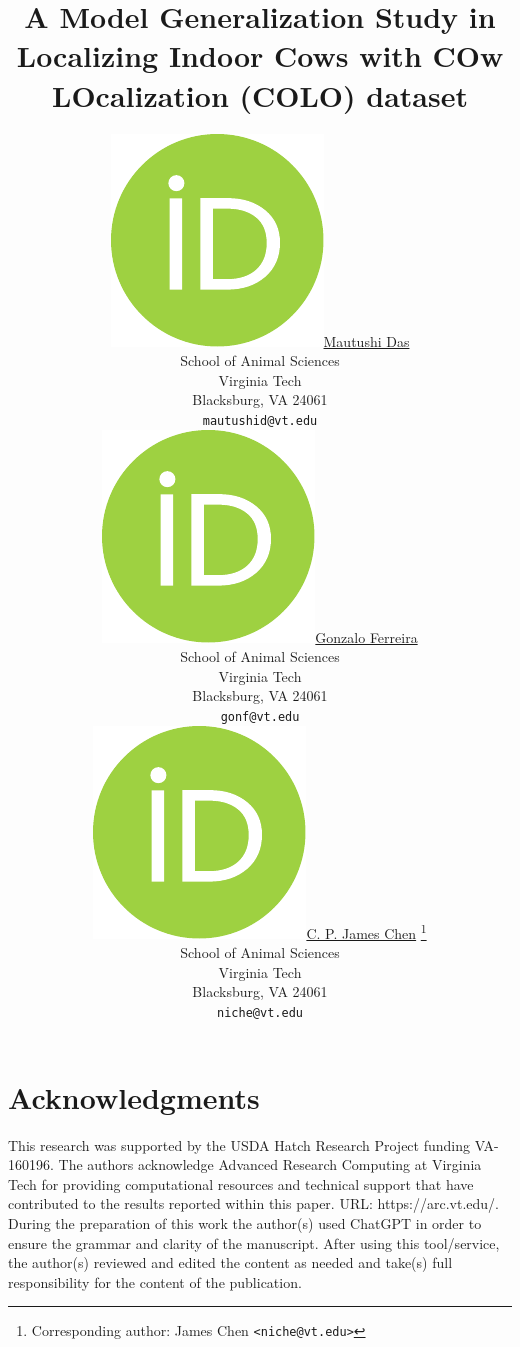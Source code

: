 \documentclass{article}
\title{A Model Generalization Study in Localizing Indoor Cows with COw LOcalization (COLO) dataset}
\author{
    \href{https://orcid.org/0009-0001-8932-142X}{\includegraphics[scale=0.06]{orcid.pdf}\hspace{1mm}Mautushi Das} \\
	School of Animal Sciences\\
	Virginia Tech\\
	Blacksburg, VA 24061 \\
	\texttt{mautushid@vt.edu} \\
	\And
    \href{https://orcid.org/0000-0002-8254-8090}{\includegraphics[scale=0.06]{orcid.pdf}\hspace{1mm}Gonzalo Ferreira} \\
	School of Animal Sciences\\
	Virginia Tech\\
	Blacksburg, VA 24061 \\
	\texttt{gonf@vt.edu} \\
	\And
	\href{https://orcid.org/0000-0002-2018-0702}{\includegraphics[scale=0.06]{orcid.pdf}\hspace{1mm}C. P. James Chen} \thanks{Corresponding author: James Chen \texttt{<niche@vt.edu>}}\\
	School of Animal Sciences\\
	Virginia Tech\\
	Blacksburg, VA 24061 \\
	\texttt{niche@vt.edu}
}
\begin{document}
\maketitle



\newpage




\section*{Acknowledgments}

This research was supported by the USDA Hatch Research Project funding VA-160196. The authors acknowledge Advanced Research Computing at Virginia Tech for providing computational resources and technical support that have contributed to the results reported within this paper. URL: https://arc.vt.edu/. During the preparation of this work the author(s) used ChatGPT in order to ensure the grammar and clarity of the manuscript. After using this tool/service, the author(s) reviewed and edited the content as needed and take(s) full responsibility for the content of the publication.


\newpage




\newpage


\end{document}
